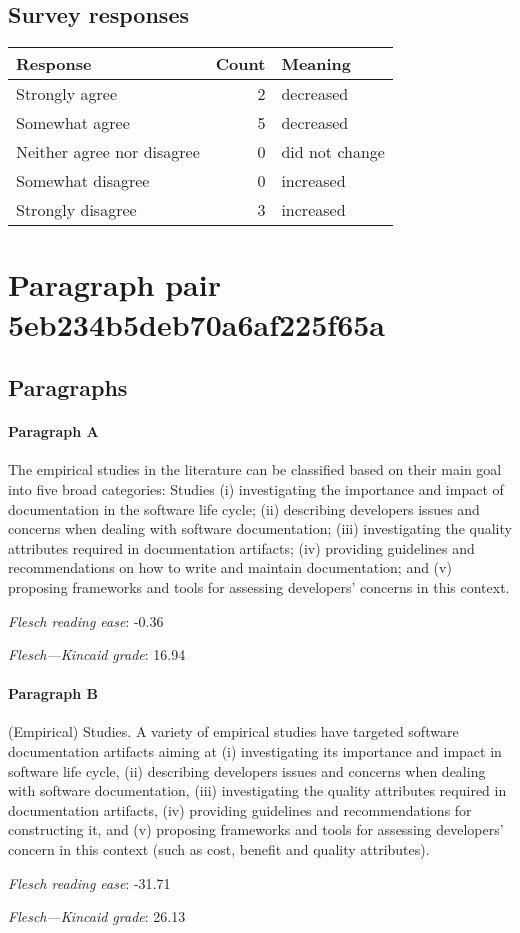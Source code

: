 \subsection{Survey responses}
\begin{tabular}{lrl}
\toprule
          \textbf{Response} &  \textbf{Count} & \textbf{Meaning} \\
\midrule
             Strongly agree &               2 &        decreased \\
             Somewhat agree &               5 &        decreased \\
 Neither agree nor disagree &               0 &   did not change \\
          Somewhat disagree &               0 &        increased \\
          Strongly disagree &               3 &        increased \\
\bottomrule
\end{tabular}

\section{Paragraph pair 5eb234b5deb70a6af225f65a}
\subsection{Paragraphs}
\paragraph{Paragraph A}
The empirical studies in the literature can be classified based on their main goal into five broad categories: Studies (i) investigating the importance and impact of documentation in the software life cycle; (ii) describing developers issues and concerns when dealing with software documentation; (iii) investigating the quality attributes required in documentation artifacts; (iv) providing guidelines and recommendations on how to write and maintain documentation; and (v) proposing frameworks and tools for assessing developers' concerns in this context.\par\medskip
\emph{Flesch reading ease}: -0.36\par
\emph{Flesch---Kincaid grade}: 16.94

\paragraph{Paragraph B}
(Empirical) Studies. A variety of empirical studies have targeted software documentation artifacts aiming at (i) investigating its importance and impact in software life cycle, (ii) describing developers issues and concerns when dealing with software documentation, (iii) investigating the quality attributes required in documentation artifacts, (iv) providing guidelines and recommendations for constructing it, and (v) proposing frameworks and tools for assessing developers' concern in this context (such as cost, benefit and quality attributes).\par\medskip
\emph{Flesch reading ease}: -31.71\par
\emph{Flesch---Kincaid grade}: 26.13

